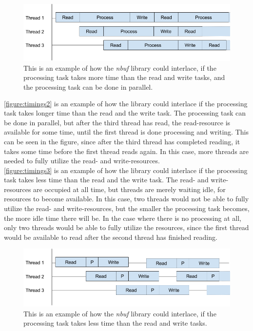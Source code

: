 \documentclass[a4paper]{article}
\newcommand{\nbuf}{\textit{nbuf} }
\begin{document}
\begin{figure}
	\begin{adjustwidth}{-0.5in}{-0.5in}
    \centering
     \includegraphics[scale=0.5]{figures/timings2.png}
  	\caption{This is an example of how the \nbuf library could interlace, if the processing task takes more time than the read and write tasks, and the processing task can be done in parallel.}
	\label{figure:timings2}
	\end{adjustwidth}
\end{figure}

\autoref{figure:timings2} is an example of how the library could interlace if the processing task takes longer time than the read and the write task. The processing task can be done in parallel, but after the third thread has read, the read-resource is available for some time, until the first thread is done processing and writing. This can be seen in the figure, since after the third thread has completed reading, it takes some time before the first thread reads again. In this case, more threads are needed to fully utilize the read- and write-resources.\\


\autoref{figure:timings3} is an example of how the library could interlace if the processing task takes less time than the read and the write task. The read- and write-resources are occupied at all time, but threads are merely waiting idle, for resources to become available. In this case, two threads would not be able to fully utilize the read- and write-resources, but the smaller the processing task becomes, the more idle time there will be. In the case where there is no processing at all, only two threads would be able to fully utilize the resources, since the first thread would be available to read after the second thread has finished reading.\\

\begin{figure}
	\begin{adjustwidth}{-0.5in}{-0.5in}
    \centering
     \includegraphics[scale=0.5]{figures/timings3.png}
  	\caption{This is an example of how the \nbuf library could interlace, if the processing task takes less time than the read and write tasks.}
	\label{figure:timings3}
	\end{adjustwidth}
\end{figure}
\end{document}
